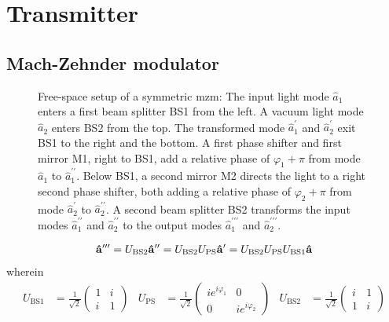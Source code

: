 \section{Transmitter}

\subsection{Mach-Zehnder modulator}

\begin{figure}[htb]
	\centering
	
	\caption{Free-space setup of a symmetric \gls{mzm}: The input light mode $\hat{a}_1$ enters a first beam splitter BS1 from the left. A vacuum light mode $\hat{a}_2$ enters BS2 from the top. The transformed mode $\hat{a}_1^\prime$ and $\hat{a}_2^\prime$ exit BS1 to the right and the bottom. A first phase shifter and first mirror M1, right to BS1, add a relative phase of $\varphi_1+\pi$ from mode $\hat{a}_1$ to $\hat{a}_1^{\prime\prime}$. Below BS1, a second mirror M2 directs the light to a right second phase shifter, both adding a relative phase of $\varphi_2+\pi$ from mode $\hat{a}_2^\prime$ to $\hat{a}_2^{\prime\prime}$. A second beam splitter BS2 transforms the input modes $\hat{a}_1^{\prime\prime}$ and $\hat{a}_2^{\prime\prime}$ to the output modes $\hat{a}_1^{\prime\prime\prime}$ and $\hat{a}_2^{\prime\prime\prime}$.}
\end{figure}

\begin{equation}
	\begin{split}
		\vb{\hat{a}}^{\prime\prime\prime}
		=
		U_\text{BS2}
		\vb{\hat{a}}^{\prime\prime}
		=
		U_\text{BS2}
		U_\text{PS}
		\vb{\hat{a}}^{\prime}
		=
		U_\text{BS2}
		U_\text{PS}
		U_\text{BS1}
		\vb{\hat{a}}
	\end{split}
\end{equation}
wherein
\begin{align}
	U_\text{BS1}
	&=
	\frac{1}{\sqrt{2}}
	\begin{pmatrix}
		1 & i \\
		i & 1
	\end{pmatrix}
	&
	U_\text{PS}
	&=
	\frac{1}{\sqrt{2}}
	\begin{pmatrix}
		ie^{i\varphi_1} & 0 \\
		0 & ie^{i\varphi_2}
	\end{pmatrix}
	&
	U_\text{BS2}
	&=
	\frac{1}{\sqrt{2}}
	\begin{pmatrix}
		i & 1 \\
		1 & i
	\end{pmatrix}
\end{align}


